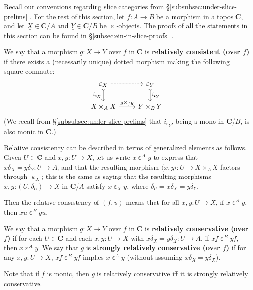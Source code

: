 \documentclass{amsart}
\newcommand\bC{\mathbf{C}}
\newcommand\br[1]{\langle{}#1\rangle{}}
\newcommand\defword[1]{{\boldmath \textbf{#1}}}
\newcommand\ein{\mathrel{\varepsilon}}
\newcommand\und[1]{\underline{#1}}
\newcommand\unein{{\ein}}
\newcommand\prerefpost[3]{%
  \texorpdfstring%
    {\hyperref[#2]{#1\ref*{#2}#3}}%
    {#1\ref*{#2}#3}%
}
\newcommand\sref[1]{\prerefpost{\S}{#1}{}}
\theoremstyle{definition}
\theoremstyle{remark}
\theoremstyle{plainwithref}
\begin{document}
Recall our conventions regarding slice categories from \sref{subsubsec:under-slice-prelims}.
For the rest of this section, let \( f \colon A \to B \) be a morphism in a topos \( \bC \), and let \( \und X \in \bC / A \) and \( \und Y \in \bC / B \) be \( \ein \)-objects.
The proofs of all the statements in this section can be found in \sref{subsec:ein-in-slice-proofs}.

\begin{defn}
  We say that a morphism \( g \colon X \to Y \) over \( f \) in \( \bC \) is \defword{relatively consistent (over \( f \))}  if there exists a (necessarily unique) dotted morphism making the following square commute:
  \begin{equation} \label{eq:rel-consis-square}
    \begin{tikzcd}
      \ein_X \ar[r, dashed] \ar[d, "i_{\unein_X}"', >->] & \ein_Y \ar[d, "i_{\unein_Y}", >->] \\
      X \times_A X \ar[r, "g \times_f g"] & Y \times_B Y
    \end{tikzcd}
\end{equation}
(We recall from \sref{subsubsec:under-slice-prelims} that \( i_{\ein_Y} \), being a mono in \( \bC / B \), is also monic in \( \bC \).)
\end{defn}

\begin{rmk} \label{rmk:ein-a-notation}
  Relative consistency can be described in terms of generalized elements as follows.
  Given \( U \in \bC \) and \( x,y \colon U \to X \), let us write \( x \ein^A y \) to express that \( x \delta_X = y \delta_Y \colon U \to A \), and that the resulting morphism \( \br{x,y} \colon U \to X \times_A X \) factors through \( \unein_{X} \); this is the same as saying that the resulting morphisms \( x,y \colon (U, \delta_U) \to \und X \) in \( \bC / A \) satisfy \( x \ein_{X} y \), where \( \delta_U = x \delta_X = y \delta_Y \).

  Then the relative consistency of \( (f, u) \) means that for all \( x,y \colon U \to X \), if \( x \ein^A y \), then \( x u \ein^B y u \).
\end{rmk}

\begin{defn}
  We say that a morphism \( g \colon X \to Y \) over \( f \) in \( \bC \) is \defword{relatively conservative (over \( f \))} if for each \( U \in \bC \) and each \( x,y \colon U \to X \) with \( x \delta_X = y \delta_X \colon U \to A \), if \( x f \ein^B y f \), then \( x \ein^A y \).
  We say that \( g \) is \defword{strongly relatively conservative (over \( f \))} if for any \( x,y \colon U \to X \), \( x f \ein^B y f \) implies \( x \ein^A y \) (without assuming \( x \delta_X = y \delta_X \)).

  Note that if \( f \) is monic, then \( g \) is relatively conservative iff it is strongly relatively conservative.
\end{defn}
\end{document}
